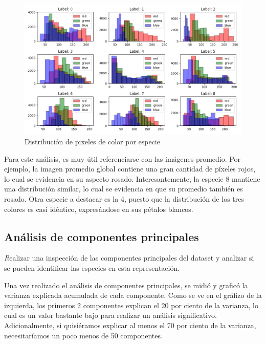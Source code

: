 \documentclass{article}
\begin{document}

\begin{figure}[h!]
  \centering    
  \includegraphics[width=1\textwidth]{8_3_pixeles_especies_color.png}
  \caption{Distribución de pixeles de color por especie}
\end{figure}

Para este análisis, es muy útil referenciarse con las imágenes promedio.
Por ejemplo, la imagen promedio global contiene una gran cantidad de píxeles
rojos, lo cual se evidencia en su aspecto rosado. Interesantemente, la especie
8 mantiene una distribución similar, lo cual se evidencia en que su promedio
también es rosado. Otra especie a destacar es la 4, puesto que la distribución
de los tres colores es casi idéntico, expresándose en sus pétalos blancos.
\pagebreak

\subsection{Análisis de componentes principales}

{\emph Realizar una inspección de las componentes principales del dataset y analizar si se
pueden identiﬁcar las especies en esta representación.}

Una vez realizado el análisis de componentes principales, se midió y graficó la
varianza explicada acumulada de cada componente. Como se ve en el gráfizo de la
izquierda, los primeros 2 componentes explican el 20 por ciento de la varianza,
lo cual es un valor bastante bajo para realizar un análisis significativo.
Adicionalmente,  si quisiéramos explicar al menos el 70 por ciento de la varianza,
necesitaríamos un poco menos de 50 componentes.
\end{document}
